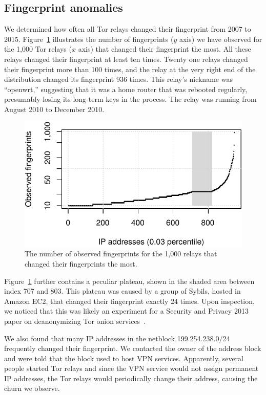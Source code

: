 \subsection{Fingerprint anomalies}
\label{sec:fingerprints}
We determined how often all Tor relays changed their fingerprint from 2007 to
2015.  Figure~\ref{fig:fingerprints} illustrates the number of fingerprints ($y$
axis) we have observed for the 1,000 Tor relays ($x$ axis) that changed their
fingerprint the most.  All these relays changed their fingerprint at least ten
times.  Twenty one relays changed their fingerprint more than 100 times, and the
relay at the very right end of the distribution changed its fingerprint 936
times.  This relay's nickname was ``openwrt,'' suggesting that it was a home
router that was rebooted regularly, presumably losing its long-term keys in the
process.  The relay was running from August 2010 to December 2010.

\begin{figure}[t]
	\centering
	\includegraphics[width=0.9\linewidth]{diagrams/fingerprints.pdf}
	\caption{The number of observed fingerprints for the 1,000 relays that
	changed their fingerprints the most.}
	\label{fig:fingerprints}
\end{figure}

Figure~\ref{fig:fingerprints} further contains a peculiar plateau, shown in the
shaded area between index 707 and 803.  This plateau was caused by a group of
Sybils, hosted in Amazon EC2, that changed their fingerprint exactly 24 times.
Upon inspection, we noticed that this was likely an experiment for a Security
and Privacy 2013 paper on deanonymizing Tor onion
services~\cite[\S~V]{Biryukov2013a}.

We also found that many IP addresses in the netblock 199.254.238.0/24
frequently changed their fingerprint.  We contacted the owner of the address
block and were told that the block used to host VPN services.  Apparently,
several people started Tor relays and since the VPN service would not assign
permanent IP addresses, the Tor relays would periodically change their address,
causing the churn we observe.

